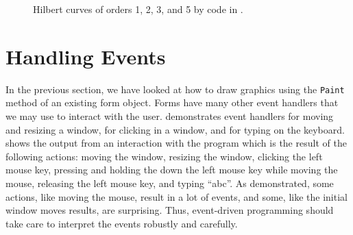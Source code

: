 \documentclass[fsharpNotes.tex]{subfiles}
\begin{document}
\begin{figure}
  \caption{Hilbert curves of orders 1, 2, 3, and 5 by code in .}
  \label{fig:hilbert}
\end{figure}
\clearpage %

\section{Handling Events}
In the previous section, we have looked at how to draw graphics using the \lstinline!Paint! method of an existing form object. Forms have many other event handlers that we may use to interact with the user.  demonstrates event handlers for moving and resizing a window, for clicking in a window, and for typing on the keyboard. 
%
%
%
 shows the output from an interaction with the program which is the result of the following actions: moving the window, resizing the window, clicking the left mouse key, pressing and holding the down the left mouse key while moving the mouse, releasing the left mouse key, and typing ``abc''. As demonstrated, some actions, like moving the mouse, result in a lot of events, and some, like the initial window moves results, are surprising. Thus, event-driven programming should take care to interpret the events robustly and carefully.
\end{document}
